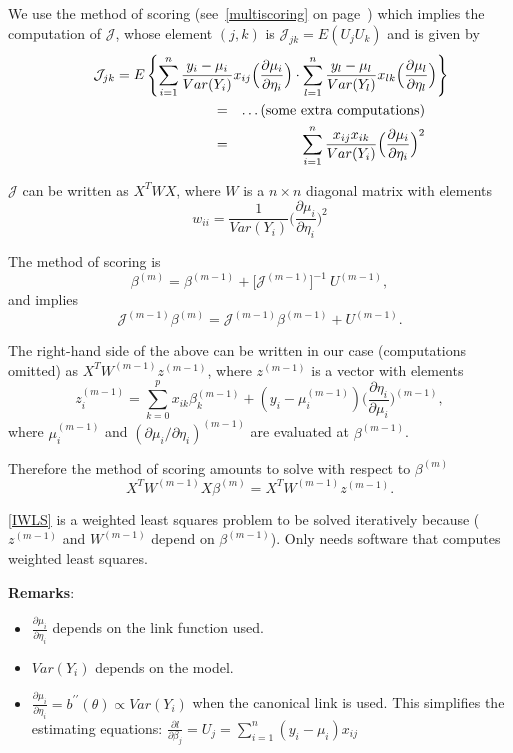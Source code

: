 \documentclass{beamer}
\newcommand{\bs}{\bigskip}
\begin{document}
\begin{frame}
We use the method of scoring (see~\eqref{multiscoring} on page~\pageref{multiscoring})  which implies
the computation of ${\mathcal J}$, whose
element $(j,k)$ is ${\mathcal J}_{jk} = E(U_j U_k)$ and is given by
\begin{eqnarray*}
  \lefteqn{{\mathcal J}_{jk} = E \left\{ \sum_{i=1}^n
\frac{y_i-\mu_i}{Var(Y_i)} x_{ij} \Big(\frac{\partial \mu_i}{\partial
  \eta_i}\Big) \cdot \sum_{l=1}^n
\frac{y_l-\mu_l}{Var(Y_l)} x_{lk} \Big(\frac{\partial \mu_l}{\partial
  \eta_l}\Big) \right\}} \hspace*{3cm}\\
& = & \ldots (\mbox{some extra computations})\\
& = &  \sum_{i=1}^n \frac{x_{ij} x_{ik}}{Var(Y_i)}
\Big(\frac{\partial \mu_i}{\partial
  \eta_i}\Big)^2
\end{eqnarray*}

${\mathcal J}$ can be written as $X^T W X$, where $W$ is a $n \times
n$ diagonal matrix with elements
$$w_{ii} = \frac{1}{Var(Y_i)} \Big(\frac{\partial \mu_i}{\partial
  \eta_i}\Big)^2$$
\end{frame}

\begin{frame}
The method of scoring is
$$\beta^{(m)} = \beta^{(m-1)} + \big[{\mathcal J}^{(m-1)}\big]^{-1} \ U^{(m-1)},  $$
and implies
$${\mathcal J}^{(m-1)} \beta^{(m)} = {\mathcal J}^{(m-1)}
\beta^{(m-1)} + U^{(m-1)}.$$

The right-hand side of the above can be written in our case
(computations omitted) as $X^T W^{(m-1)}
z^{(m-1)}$, where $z^{(m-1)}$ is a vector with elements
$$z_i^{(m-1)} = \sum_{k=0}^p x_{ik} \beta_k^{(m-1)} +
  (y_i-\mu_i^{(m-1)})\Big(\frac{\partial \eta_i}{\partial \mu_i}\Big)^{(m-1)},$$
where $\mu_i^{(m-1)}$ and $(\partial \mu_i/\partial \eta_i)^{(m-1)}$ are evaluated at
  $\beta^{(m-1)}$.
\end{frame}

\begin{frame}
Therefore the method of scoring amounts to solve with respect to $ \beta^{(m)}$
\begin{equation}
  \label{IWLS}
  X^T W^{(m-1)} X \beta^{(m)} = X^T W^{(m-1)} z^{(m-1)}.
\end{equation}
\label{IWLSweights}

\eqref{IWLS} is a weighted least squares problem to be solved
iteratively because ($z^{(m-1)}$ and $W^{(m-1)}$ depend on 
$\beta^{(m-1)}$). Only needs software that computes weighted least squares.

\bs
\textbf{Remarks}:
\begin{itemize}
\item $\frac{\partial \mu_i}{\partial \eta_i}$ depends on the link
  function used.
\item $Var(Y_i)$ depends on the model.
\item $\frac{\partial \mu_i}{\partial \eta_i}= b^{\prime \prime}(\theta) \propto Var(Y_i)$ when the canonical link
is used. This simplifies the estimating equations:
$\frac{\partial l}{\partial \beta_j} = U_j = \sum_{i=1}^n
(y_i-\mu_i) x_{ij}$
\end{itemize}
\end{frame}
\end{document}
